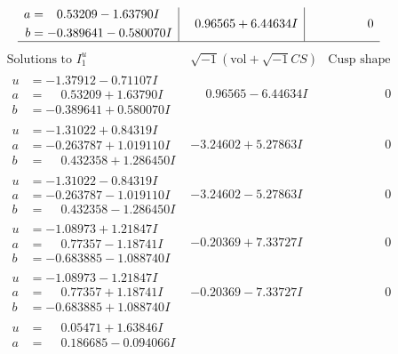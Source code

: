 \documentclass[1p]{elsarticle_modified}
\theoremstyle{definition}
\newcommand{\I}{\sqrt{-1}}
\begin{document}
$$\begin{array}{c|c|c}
\begin{aligned}
a &= \phantom{-}0.53209 - 1.63790 I \\
b &= -0.389641 - 0.580070 I\end{aligned}
 & \phantom{-}0.96565 + 6.44634 I & \phantom{-0.000000 } 0\\
 \hline 
 \end{array}$$\newpage$$\begin{array}{c|c|c}  
\text{Solutions to }I^u_{1}& \I (\text{vol} + \sqrt{-1}CS) & \text{Cusp shape}\\
 \hline 
\begin{aligned}
u &= -1.37912 - 0.71107 I \\
a &= \phantom{-}0.53209 + 1.63790 I \\
b &= -0.389641 + 0.580070 I\end{aligned}
 & \phantom{-}0.96565 - 6.44634 I & \phantom{-0.000000 } 0 \\ \hline\begin{aligned}
u &= -1.31022 + 0.84319 I \\
a &= -0.263787 + 1.019110 I \\
b &= \phantom{-}0.432358 + 1.286450 I\end{aligned}
 & -3.24602 + 5.27863 I & \phantom{-0.000000 } 0 \\ \hline\begin{aligned}
u &= -1.31022 - 0.84319 I \\
a &= -0.263787 - 1.019110 I \\
b &= \phantom{-}0.432358 - 1.286450 I\end{aligned}
 & -3.24602 - 5.27863 I & \phantom{-0.000000 } 0 \\ \hline\begin{aligned}
u &= -1.08973 + 1.21847 I \\
a &= \phantom{-}0.77357 - 1.18741 I \\
b &= -0.683885 - 1.088740 I\end{aligned}
 & -0.20369 + 7.33727 I & \phantom{-0.000000 } 0 \\ \hline\begin{aligned}
u &= -1.08973 - 1.21847 I \\
a &= \phantom{-}0.77357 + 1.18741 I \\
b &= -0.683885 + 1.088740 I\end{aligned}
 & -0.20369 - 7.33727 I & \phantom{-0.000000 } 0 \\ \hline\begin{aligned}
u &= \phantom{-}0.05471 + 1.63846 I \\
a &= \phantom{-}0.186685 - 0.094066 I \\

\end{aligned}
\end{array}$$
\end{document}
